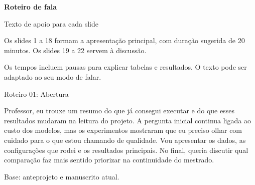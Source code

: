 \documentclass[aspectratio=169,11pt]{beamer}
\newcommand{\fonte}[1]{\par\vfill{\fontsize{7}{8.2}\selectfont\color{cinza}#1\par}}
\newif\ifroteiro
\begin{document}
\ifroteiro
{}

\begin{frame}
\par\vspace{13mm}
{\LARGE\bfseries Roteiro de fala}\par\vspace{5mm}
Texto de apoio para cada slide\par\vspace{4mm}
{\small Os slides 1 a 18 formam a apresentação principal, com duração sugerida de 20 minutos. Os slides 19 a 22 servem à discussão.\par\medskip
Os tempos incluem pausas para explicar tabelas e resultados. O texto pode ser adaptado ao seu modo de falar.}
\end{frame}

\newcommand{\fala}[5]{%
\begin{frame}[t,noframenumbering]{Roteiro #1: #2}
\noindent{\small\color{destaque}#3}\par\medskip
\setlength{\parskip}{1.5mm}\fontsize{10}{12.3}\selectfont #4
\fonte{#5}
\end{frame}}

\fala{01}{Abertura}{Cerca de 30 segundos}{
Professor, eu trouxe um resumo do que já consegui executar e do que esses resultados mudaram na leitura do projeto. A pergunta inicial continua ligada ao custo dos modelos, mas os experimentos mostraram que eu preciso olhar com cuidado para o que estou chamando de qualidade. Vou apresentar os dados, as configurações que rodei e os resultados principais. No final, queria discutir qual comparação faz mais sentido priorizar na continuidade do mestrado.
}{Base: anteprojeto e manuscrito atual.}
\end{document}
